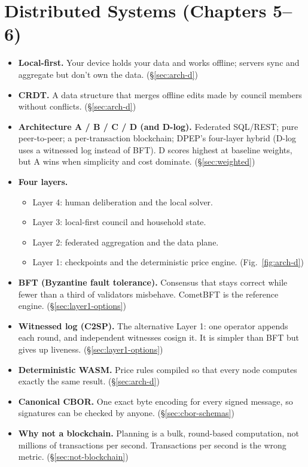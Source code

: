 \documentclass[10pt,twoside,openany]{book}
\theoremstyle{dpepstyle}
\begin{document}
\section*{Distributed Systems (Chapters 5--6)}

\begin{itemize}[leftmargin=1.2em,itemsep=2pt,topsep=2pt]
\item \textbf{Local-first.} Your device holds your data and works offline; servers sync and aggregate but don't own the data. (\S\ref{sec:arch-d})
\item \textbf{CRDT.} A data structure that merges offline edits made by council members without conflicts. (\S\ref{sec:arch-d})
\item \textbf{Architecture A / B / C / D (and D-log).} Federated SQL/REST; pure peer-to-peer; a per-transaction blockchain; DPEP's four-layer hybrid (D-log uses a witnessed log instead of BFT). D scores highest at baseline weights, but A wins when simplicity and cost dominate. (\S\ref{sec:weighted})
\item \textbf{Four layers.}
\begin{itemize}[leftmargin=1.2em,itemsep=2pt,topsep=2pt]
\item Layer 4: human deliberation and the local solver.
\item Layer 3: local-first council and household state.
\item Layer 2: federated aggregation and the data plane.
\item Layer 1: checkpoints and the deterministic price engine. (Fig.~\ref{fig:arch-d})
\end{itemize}
\item \textbf{BFT (Byzantine fault tolerance).} Consensus that stays correct while fewer than a third of validators misbehave. CometBFT is the reference engine. (\S\ref{sec:layer1-options})
\item \textbf{Witnessed log (C2SP).} The alternative Layer 1: one operator appends each round, and independent witnesses cosign it. It is simpler than BFT but gives up liveness. (\S\ref{sec:layer1-options})
\item \textbf{Deterministic WASM.} Price rules compiled so that every node computes exactly the same result. (\S\ref{sec:arch-d})
\item \textbf{Canonical CBOR.} One exact byte encoding for every signed message, so signatures can be checked by anyone. (\S\ref{sec:cbor-schemas})
\item \textbf{Why not a blockchain.} Planning is a bulk, round-based computation, not millions of transactions per second. Transactions per second is the wrong metric. (\S\ref{sec:not-blockchain})
\end{itemize}
\end{document}
